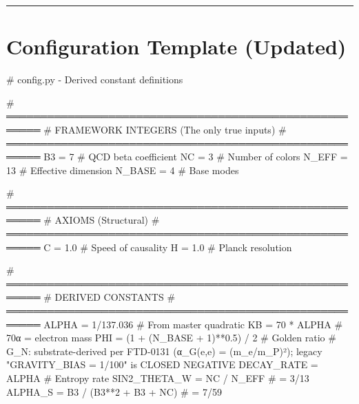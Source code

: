 \documentclass[
  11pt,
  letterpaper,
  twoside,
  openright]{book}
\newenvironment{Shaded}{\begin{snugshade}}{\end{snugshade}}
\newcommand{\CommentTok}[1]{\textcolor[rgb]{0.37,0.37,0.37}{#1}}
\newcommand{\DecValTok}[1]{\textcolor[rgb]{0.68,0.00,0.00}{#1}}
\newcommand{\FloatTok}[1]{\textcolor[rgb]{0.68,0.00,0.00}{#1}}
\newcommand{\NormalTok}[1]{\textcolor[rgb]{0.00,0.23,0.31}{#1}}
\newcommand{\OperatorTok}[1]{\textcolor[rgb]{0.37,0.37,0.37}{#1}}
\begin{document}
\begin{center}\rule{0.5\linewidth}{0.5pt}\end{center}

\section{Configuration Template
(Updated)}\label{configuration-template-updated}

\begin{Shaded}
\begin{Highlighting}[]
\CommentTok{\# config.py {-} Derived constant definitions}

\CommentTok{\# ═══════════════════════════════════════════════════════}
\CommentTok{\# FRAMEWORK INTEGERS (The only true inputs)}
\CommentTok{\# ═══════════════════════════════════════════════════════}
\NormalTok{B3 }\OperatorTok{=} \DecValTok{7}                    \CommentTok{\# QCD beta coefficient}
\NormalTok{NC }\OperatorTok{=} \DecValTok{3}                    \CommentTok{\# Number of colors}
\NormalTok{N\_EFF }\OperatorTok{=} \DecValTok{13}                \CommentTok{\# Effective dimension}
\NormalTok{N\_BASE }\OperatorTok{=} \DecValTok{4}                \CommentTok{\# Base modes}

\CommentTok{\# ═══════════════════════════════════════════════════════}
\CommentTok{\# AXIOMS (Structural)}
\CommentTok{\# ═══════════════════════════════════════════════════════}
\NormalTok{C }\OperatorTok{=} \FloatTok{1.0}                   \CommentTok{\# Speed of causality}
\NormalTok{H }\OperatorTok{=} \FloatTok{1.0}                   \CommentTok{\# Planck resolution}

\CommentTok{\# ═══════════════════════════════════════════════════════}
\CommentTok{\# DERIVED CONSTANTS}
\CommentTok{\# ═══════════════════════════════════════════════════════}
\NormalTok{ALPHA }\OperatorTok{=} \DecValTok{1}\OperatorTok{/}\FloatTok{137.036}                          \CommentTok{\# From master quadratic}
\NormalTok{KB }\OperatorTok{=} \DecValTok{70} \OperatorTok{*}\NormalTok{ ALPHA                            }\CommentTok{\# 70α = electron mass}
\NormalTok{PHI }\OperatorTok{=}\NormalTok{ (}\DecValTok{1} \OperatorTok{+}\NormalTok{ (N\_BASE }\OperatorTok{+} \DecValTok{1}\NormalTok{)}\OperatorTok{**}\FloatTok{0.5}\NormalTok{) }\OperatorTok{/} \DecValTok{2}          \CommentTok{\# Golden ratio}
\CommentTok{\# G\_N: substrate{-}derived per FTD{-}0131 (α\_G(e,e) = (m\_e/m\_P)²); legacy "GRAVITY\_BIAS = 1/100" is CLOSED NEGATIVE}
\NormalTok{DECAY\_RATE }\OperatorTok{=}\NormalTok{ ALPHA                         }\CommentTok{\# Entropy rate}
\NormalTok{SIN2\_THETA\_W }\OperatorTok{=}\NormalTok{ NC }\OperatorTok{/}\NormalTok{ N\_EFF                  }\CommentTok{\# = 3/13}
\NormalTok{ALPHA\_S }\OperatorTok{=}\NormalTok{ B3 }\OperatorTok{/}\NormalTok{ (B3}\OperatorTok{**}\DecValTok{2} \OperatorTok{+}\NormalTok{ B3 }\OperatorTok{+}\NormalTok{ NC)           }\CommentTok{\# = 7/59}
\end{Highlighting}
\end{Shaded}
\end{document}
